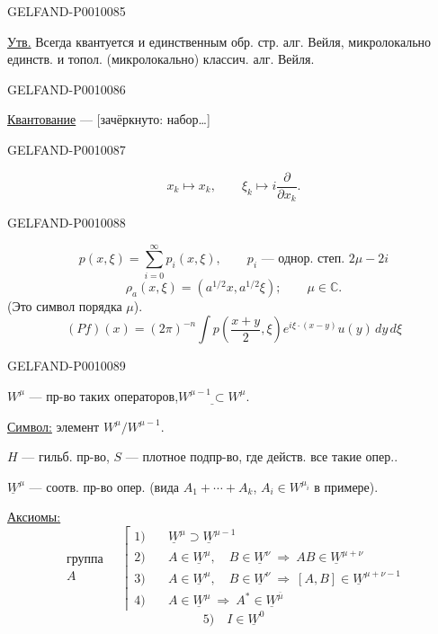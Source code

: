 \begin{GelfandAdjacentEvidence}{GELFAND-P001008}{5}


\underline{Утв.} Всегда квантуется и единственным обр. стр. алг. Вейля, микролокально единств. и топол. (микролокально) классич. алг. Вейля.
\end{GelfandAdjacentEvidence}
\begin{GelfandAdjacentEvidence}{GELFAND-P001008}{6}


\underline{Квантование} --- [зачёркнуто: набор\ldots]
\end{GelfandAdjacentEvidence}
\begin{GelfandAdjacentEvidence}{GELFAND-P001008}{7}


\[
x_k\longmapsto x_k,\qquad \xi_k\longmapsto i\frac{\partial}{\partial x_k}.
\]
\end{GelfandAdjacentEvidence}
\begin{GelfandAdjacentEvidence}{GELFAND-P001008}{8}

\[
p(x,\xi)=\sum_{i=0}^{\infty}p_i(x,\xi),\qquad
p_i\text{ --- однор. степ. }2\mu-2i
\]
\[
\rho_a(x,\xi)=(a^{1/2}x,a^{1/2}\xi);\qquad \mu\in\mathbb C.
\]
(Это символ порядка $\mu$).
\[
(Pf)(x)=(2\pi)^{-n}\int p\left(\frac{x+y}{2},\xi\right)
  e^{i\xi\cdot(x-y)}u(y)\,dy\,d\xi
\]
\end{GelfandAdjacentEvidence}
\begin{GelfandAdjacentEvidence}{GELFAND-P001008}{9}


$W^\mu$ --- пр-во таких операторов,\qquad $\underline{W^{\mu-1}\subset W^\mu}$.

\underline{Символ:} элемент $W^\mu/W^{\mu-1}$.

$H$ --- гильб. пр-во, $S$ --- плотное подпр-во, где действ. все такие опер..

$\underline W^\mu$ --- соотв. пр-во опер.
(вида $A_1+\cdots+A_k$, $A_i\in W^{\mu_i}$ в примере).
\end{GelfandAdjacentEvidence}


\underline{Аксиомы:}
\[
\substack{\text{группа}\\ A}
\quad\left\lceil
\begin{aligned}
1)\quad &\underline W^\mu\supset\underline W^{\mu-1}\\
2)\quad &A\in\underline W^\mu,\quad B\in\underline W^\nu
 \ \Longrightarrow\ AB\in\underline W^{\mu+\nu}\\
3)\quad &A\in\underline W^\mu,\quad B\in\underline W^\nu
 \ \Longrightarrow\ [A,B]\in\underline W^{\mu+\nu-1}\\
4)\quad &A\in\underline W^\mu\ \Longrightarrow\ A^*\in\underline W^{\bar\mu}
\end{aligned}\right.
\]
\[
5)\quad I\in\underline W^0
\]


